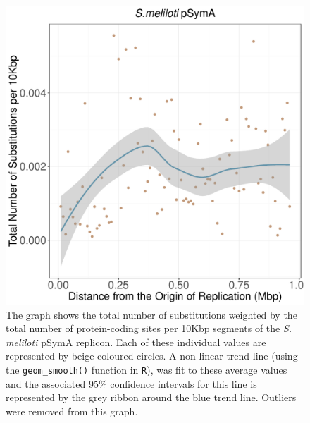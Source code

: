 \documentclass[11pt]{article}
\newcommand{\smel}{\textit{S.\,meliloti}\xspace}
\newcommand{\pa}{pSymA\xspace}
\begin{document}
\begin{figure}[h]
	\begin{center}
		\includegraphics[width=\textwidth]{./figs/pSymA_10KB_weighted_subs_nonpar_22Sep20.pdf}
		\caption{\label{fig:pSymA_nonpar}The graph shows the total number of substitutions weighted by the total number of protein-coding sites per 10Kbp segments of the \smel \pa replicon. Each of these individual values are represented by beige coloured circles. A non-linear trend line (using the \texttt{geom\_smooth()} function in \texttt{R}), was fit to these average values and the associated 95\% confidence intervals for this line is represented by the grey ribbon around the blue trend line. Outliers were removed from this graph.}
	\end{center}
\end{figure}
\end{document}
